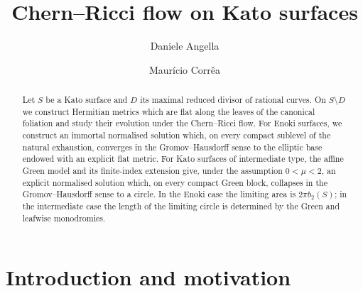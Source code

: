 \documentclass[12pt]{amsart}
\date{}
\numberwithin{equation}{section}
\theoremstyle{remark}
\theoremstyle{definition}
\begin{document}
\raggedbottom

\title{Chern--Ricci flow on Kato surfaces}

\author[Daniele Angella]{Daniele Angella}
\address[Daniele Angella]{Dipartimento di Matematica e Informatica ``Ulisse Dini'', Universit\`a degli Studi di Firenze, viale Morgagni 67/A, 50134 Firenze, Italy}

\author[Mauricio Corr\^ea]{Maur\'icio Corr\^ea}
\address[Mauricio Corr\^ea]{Dipartimento di Matematica,\newline Universit\`a degli Studi di Bari, \newline Via E. Orabona 4, I-70125, Bari, Italy
}





\begin{abstract}
Let $S$ be a Kato surface and $D$ its maximal reduced divisor of rational curves. On $S\setminus D$ we construct Hermitian metrics which are flat along the leaves of the canonical foliation and study their evolution under the Chern--Ricci flow. For Enoki surfaces, we construct an immortal normalised solution which, on every compact sublevel of the natural exhaustion, converges in the Gromov--Hausdorff sense to the elliptic base endowed with an explicit flat metric. For Kato surfaces of intermediate type, the affine Green model and its finite-index extension give, under the assumption $0<\mu<2$, an explicit normalised solution which, on every compact Green block, collapses in the Gromov--Hausdorff sense to a circle. In the Enoki case the limiting area is $2\pi b_2(S)$; in the intermediate case the length of the limiting circle is determined by the Green and leafwise monodromies.
\end{abstract}


\maketitle


\section*{Introduction and motivation}
\end{document}
